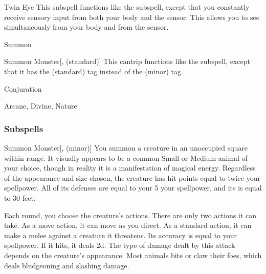 \begin{ability}[\nth{5}]{Twin Eye}
This subspell functions like the  subspell, except that you constantly receive sensory input from both your body and the sensor.
This allows you to see simultaneously from your body and from the sensor.
\end{ability}
\vspace{0.25em}

\newpage
\begin{spellsection}{Summon}

\begin{spellheader}
\end{spellheader}


\begin{ability}{Summon Monster}[,  (standard)]
This cantrip functions like the  subspell, except that it has the  (standard) tag instead of the  (minor) tag.
\end{ability}




 Conjuration

 Arcane, Divine, Nature
\end{spellsection}


\subsubsection{Subspells}


\begin{ability}[\nth{1}]{Summon Monster}[,  (minor)]
You summon a creature in an unoccupied square within \rngmed range.
It visually appears to be a common Small or Medium animal of your choice, though in reality it is a manifestation of magical energy.
Regardless of the appearance and size chosen, the creature has hit points equal to twice your spellpower.
All of its defenses are equal to your 5 \add your spellpower, and its  is equal to 30 feet.

Each round, you choose the creature's actions.
There are only two actions it can take.
As a move action, it can move as you direct.
As a standard action, it can make a melee  against a creature it threatens.
Its accuracy is equal to your spellpower.
If it hits, it deals  \minus2d.
The type of damage dealt by this attack depends on the creature's appearance.
Most animals bite or claw their foes, which deals bludgeoning and slashing damage.
\end{ability}
\vspace{0.25em}


